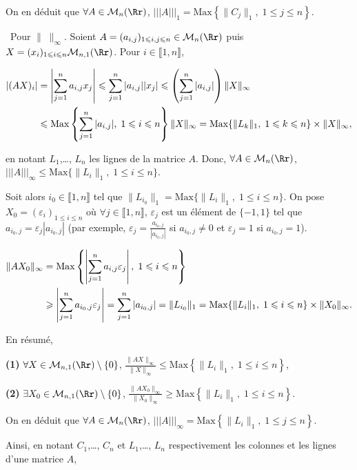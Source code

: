 {{On en déduit que $\forall A\in\mathcal{M}_n(\Rr)$, $|||A|||_1=\text{Max}\left\{\|C_j\|_1,\;1\leqslant j\leqslant n\right\}$.

\textbullet~Pour $\|\;\|_\infty$. Soient $A=(a_{i,j})_{1\leqslant i,j\leqslant n}\in\mathcal{M}_n(\Rr)$ puis $X=(x_i)_{1\leqslant i\leqslant n}\mathcal{M}_{n,1}(\Rr)$. Pour $i\in\llbracket1,n\rrbracket$,

\begin{align*}\ensuremath
|(AX)_i|&=\left|\sum_{j=1}^{n}a_{i,j}x_j\right|\leqslant\sum_{j=1}^{n}|a_{i,j}||x_j|\leqslant\left(\sum_{j=1}^{n}|a_{i,j}|\right)\|X\|_\infty\\
 &\leqslant\text{Max}\left\{\sum_{j=1}^{n}|a_{i,j}|,\;1\leqslant i\leqslant n\right\}\|X\|_\infty=\text{Max}\{\|L_k\|_1,\;1\leqslant k\leqslant n\}\times\|X\|_\infty,
\end{align*}

en notant $L_1$,\ldots, $L_n$ les lignes de la matrice $A$. Donc, $\forall A\in\mathcal{M}_n(\Rr)$, $|||A|||_\infty\leqslant\text{Max}\{\|L_i\|_1,\;1\leqslant i\leqslant n\}$.

Soit alors $i_0\in\llbracket1,n\rrbracket$ tel que $\|L_{i_0}\|_1=\text{Max}\{\|L_i\|_1,\;1\leqslant i\leqslant n\}$. On pose $X_{0}=\left(\varepsilon_i\right)_{1\leqslant i\leqslant n}$ où $\forall j\in\llbracket 1,n\rrbracket$, $\varepsilon_j$ est un élément de $\{-1,1\}$ tel que $a_{i_0,j}=\varepsilon_j|a_{i_0,j}|$ (par exemple, $\varepsilon_j= \frac{a_{i_0,j}}{|a_{i_0,j}|}$ si $a_{i_0,j}\neq0$ et $\varepsilon_j=1$ si $a_{i_0,j}=1$).

\begin{align*}\ensuremath
\|AX_0\|_\infty&=\text{Max}\left\{\left|\sum_{j=1}^{n}a_{i,j}\varepsilon_j\right|,\;1\leqslant i\leqslant n\right\}\\
 &\geqslant\left|\sum_{j=1}^{n}a_{i_0,j}\varepsilon_j\right|=\sum_{j=1}^{n}|a_{i_0,j}|=\|L_{i_0}\|_1
=\text{Max}\{\|L_i\|_1,\;1\leqslant i\leqslant n\}\times\|X_0\|_\infty.
\end{align*}

En résumé,

\textbf{(1)} $\forall X\in\mathcal{M}_{n,1}(\Rr)\setminus\{0\}$, $ \frac{\|AX\|_\infty}{\|X\|_\infty}\leqslant\text{Max}\left\{\|L_i\|_1,\;1\leqslant i\leqslant n\right\}$,

\textbf{(2)} $\exists X_0\in\mathcal{M}_{n,1}(\Rr)\setminus\{0\}$, $ \frac{\|AX_0\|_\infty}{\|X_0\|_\infty}\geqslant\text{Max}\left\{\|L_i\|_1,\;1\leqslant i\leqslant n\right\}$.

On en déduit que $\forall A\in\mathcal{M}_n(\Rr)$, $|||A|||_\infty=\text{Max}\left\{\|L_i\|_1,\;1\leqslant j\leqslant n\right\}$.

Ainsi, en notant $C_1$,\ldots, $C_n$ et $L_1$,\ldots, $L_n$ respectivement les colonnes et les lignes d'une matrice $A$,

\begin{center}
\end{center}}
}